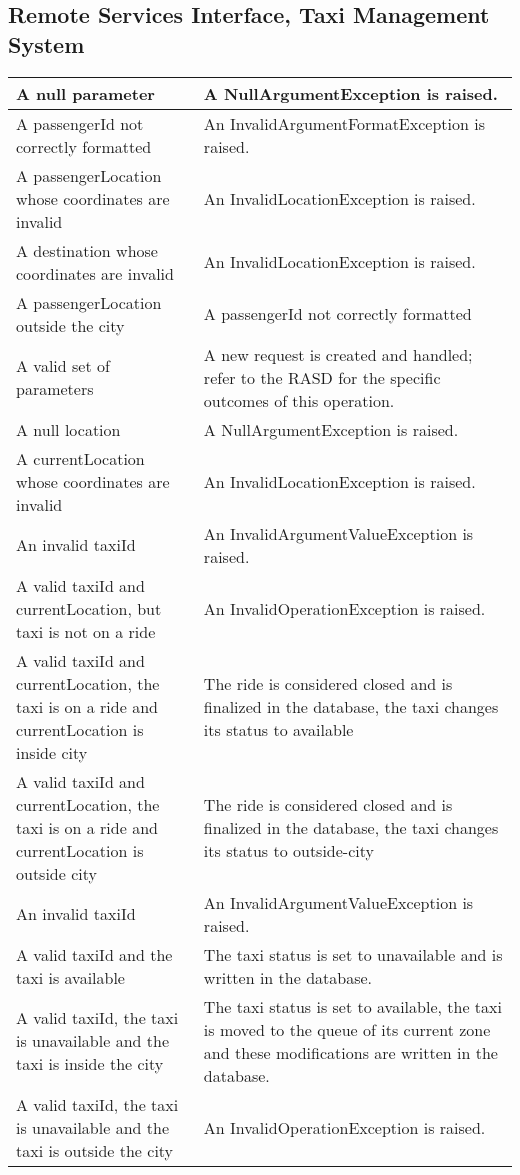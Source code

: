 \subsection{Remote Services Interface, Taxi Management System}
\begin{tabular}{p{5cm}|p{6cm}}
	\hline
	\method{requestTaxi(passengerId, passengerLocation, destination)}
	A null parameter &
	A NullArgumentException is raised.\\\hline
	A passengerId not correctly formatted &
	An InvalidArgumentFormatException is raised. \\\hline
	A passengerLocation whose coordinates are invalid &
	An InvalidLocationException is raised. \\\hline
	A destination whose coordinates are invalid &
	An InvalidLocationException is raised. \\\hline
	A passengerLocation outside the city &
	A passengerId not correctly formatted \\\hline
	A valid set of parameters &
	A new request is created and handled; refer to the RASD for the specific outcomes of this operation. \\\hline
	
	\method{endRide(taxiId, currentLocation)}
	A null location &
	A NullArgumentException is raised. \\\hline
	A currentLocation whose coordinates are invalid &
	An InvalidLocationException is raised. \\\hline
	An invalid taxiId &
	An InvalidArgumentValueException is raised. \\\hline
	A valid taxiId and currentLocation, but taxi is not on a ride &
	An InvalidOperationException is raised. \\\hline
	A valid taxiId and currentLocation, the taxi is on a ride and currentLocation is inside city&
	The ride is considered closed and is finalized in the database, the taxi changes its status to available \\\hline
	A valid taxiId and currentLocation, the taxi is on a ride and currentLocation is outside city&
	The ride is considered closed and is finalized in the database, the taxi changes its status to outside-city \\\hline

	\method{togglePressed(taxiId)}
	An invalid taxiId &
	An InvalidArgumentValueException is raised. \\\hline
	A valid taxiId and the taxi is available &
	The taxi status is set to unavailable and is written in the database. \\\hline
	A valid taxiId, the taxi is unavailable and the taxi is inside the city&
	The taxi status is set to available, the taxi is moved to the queue of its current zone and these modifications are written in the database. \\\hline
	A valid taxiId, the taxi is unavailable and the taxi is outside the city&
	An InvalidOperationException is raised. \\\hline\hline	
\end{tabular}


